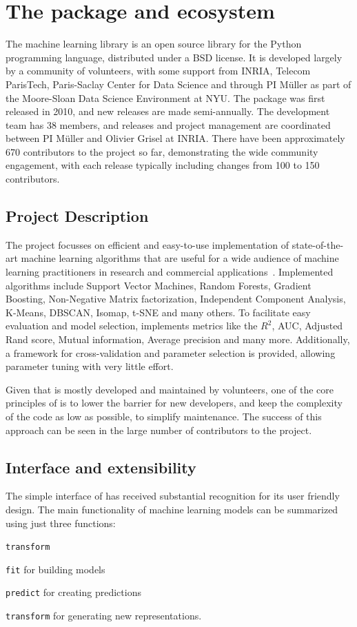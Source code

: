 \section{The \sklearn{} package and ecosystem}
The \sklearn{} machine learning library is an open source library for the
Python programming language, distributed under a BSD license.
It is developed largely by a community of volunteers, with some support from
INRIA, Telecom ParisTech, Paris-Saclay Center for Data Science and through PI
M\"uller as part of the Moore-Sloan Data Science Environment at NYU\@.
The package was first released in 2010, and new releases are made semi-annually.
The development team has 38 members, and releases and project management are
coordinated between PI M\"uller and Olivier Grisel at INRIA\@.
There have been approximately 670 contributors to the project so far, demonstrating
the wide community engagement, with each release typically including changes
from 100 to 150 contributors.

\subsection{Project Description}
The \sklearn{} project focusses on efficient and easy-to-use implementation
of state-of-the-art machine learning algorithms that are useful for a wide
audience of machine learning practitioners in research and commercial
applications~\cite{pedregosa2011scikit, buitinck2013api}.
Implemented algorithms include Support Vector Machines, Random Forests, Gradient Boosting,
Non-Negative Matrix factorization, Independent Component Analysis, K-Means, DBSCAN, Isomap,
t-SNE and many others. To facilitate easy evaluation and model selection, \sklearn{}
implements metrics like the $R^2$, AUC, Adjusted Rand score, Mutual information, Average precision
and many more. Additionally, a framework for cross-validation and parameter selection is
provided, allowing parameter tuning with very little effort.

Given that \sklearn{} is mostly developed and maintained by volunteers,
one of the core principles of \sklearn{} is to lower the barrier for new developers,
and keep the complexity of the code as low as possible, to simplify maintenance.
The success of this approach can be seen in the large number of contributors to
the project.

\subsection{Interface and extensibility}
The simple interface of \sklearn{} has received substantial recognition for its user friendly design.
The main functionality of machine learning models can
be summarized using just three functions:
\begin{labeling}{\texttt{transform}}
    \item[\texttt{fit}] for building models
    \item[\texttt{predict}] for creating predictions
    \item[\texttt{transform}] for generating new representations.
\end{labeling}

